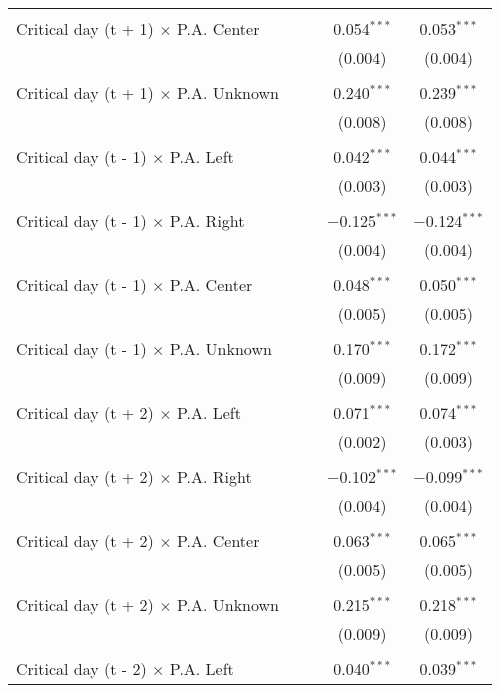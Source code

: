 \documentclass[
]{article}
\begin{document}
\begin{table}[!htbp]
{\begin{tabular}{@{\extracolsep{5pt}}lcccc}
  & & & & \\ 
 Critical day (t + 1) $\times$ P.A. Center &  &  & 0.054$^{***}$ & 0.053$^{***}$ \\ 
  &  &  & (0.004) & (0.004) \\ 
  & & & & \\ 
 Critical day (t + 1) $\times$ P.A. Unknown &  &  & 0.240$^{***}$ & 0.239$^{***}$ \\ 
  &  &  & (0.008) & (0.008) \\ 
  & & & & \\ 
 Critical day (t - 1) $\times$ P.A. Left &  &  & 0.042$^{***}$ & 0.044$^{***}$ \\ 
  &  &  & (0.003) & (0.003) \\ 
  & & & & \\ 
 Critical day (t - 1) $\times$ P.A. Right &  &  & $-$0.125$^{***}$ & $-$0.124$^{***}$ \\ 
  &  &  & (0.004) & (0.004) \\ 
  & & & & \\ 
 Critical day (t - 1) $\times$ P.A. Center &  &  & 0.048$^{***}$ & 0.050$^{***}$ \\ 
  &  &  & (0.005) & (0.005) \\ 
  & & & & \\ 
 Critical day (t - 1) $\times$ P.A. Unknown &  &  & 0.170$^{***}$ & 0.172$^{***}$ \\ 
  &  &  & (0.009) & (0.009) \\ 
  & & & & \\ 
 Critical day (t + 2) $\times$ P.A. Left &  &  & 0.071$^{***}$ & 0.074$^{***}$ \\ 
  &  &  & (0.002) & (0.003) \\ 
  & & & & \\ 
 Critical day (t + 2) $\times$ P.A. Right &  &  & $-$0.102$^{***}$ & $-$0.099$^{***}$ \\ 
  &  &  & (0.004) & (0.004) \\ 
  & & & & \\ 
 Critical day (t + 2) $\times$ P.A. Center &  &  & 0.063$^{***}$ & 0.065$^{***}$ \\ 
  &  &  & (0.005) & (0.005) \\ 
  & & & & \\ 
 Critical day (t + 2) $\times$ P.A. Unknown &  &  & 0.215$^{***}$ & 0.218$^{***}$ \\ 
  &  &  & (0.009) & (0.009) \\ 
  & & & & \\ 
 Critical day (t - 2) $\times$ P.A. Left &  &  & 0.040$^{***}$ & 0.039$^{***}$ \\ 

\end{tabular}}
\end{table}
\end{document}
